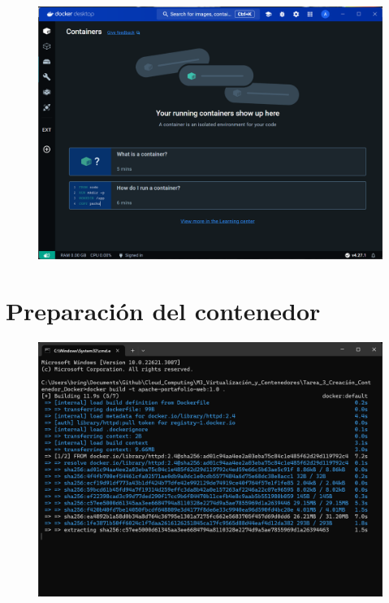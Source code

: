 \documentclass[12pt,a4paper]{article}
\begin{document}
\begin{figure}[H]
    \centering
    \includegraphics[width=1\linewidth]{M3_Virtualización_y_Contenedores/Tarea_3_Creación_Contenedor_Docker/reporte/figuras/2-2_Instalación_Docker.png}
    \label{fig:Instalación_Docker_2}
\end{figure}


\section{Preparación del contenedor}

\begin{figure}[H]
    \centering
    \includegraphics[width=1\linewidth]{M3_Virtualización_y_Contenedores/Tarea_3_Creación_Contenedor_Docker/reporte/figuras/3-1_Preparación_del_Contenedor.png}
    \label{fig:Preparación_Contenedor_1}
\end{figure}
\end{document}
